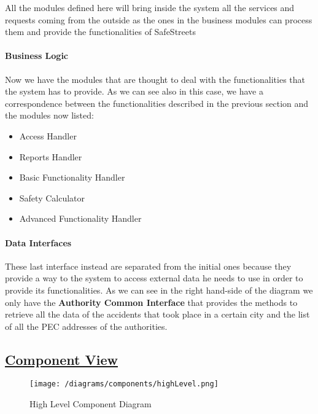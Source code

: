 			All the modules defined here will bring inside the system all the services and requests coming from the outside as the ones in the business modules can process them and provide the functionalities of SafeStreets
			
			\paragraph{Business Logic} Now we have the modules that are thought to deal with the functionalities that the system has to provide. As we can see also in this case, we have a correspondence between the functionalities described in the previous section and the modules now listed:
			
			\begin{itemize}
				\item Access Handler
				\item Reports Handler
				\item Basic Functionality Handler
				\item Safety Calculator
				\item Advanced Functionality Handler
			\end{itemize}
		
			\paragraph{Data Interfaces} These last interface instead are separated from the initial ones because they provide a way to the system to access external data he needs to use in order to provide its functionalities. As we can see in the right hand-side of the diagram we only have the \textbf{Authority Common Interface} that provides the methods to retrieve all the data of the accidents that took place in a certain city and the list of all the PEC addresses of the authorities.
		
	\subsection[Component View]{\hyperlink{toc}{Component View}}
		\label{sec:componentView}
		
		\begin{figure}[ht]
			\centering
			\texttt{[image: /diagrams/components/highLevel.png]}
			\caption{\label{fig:highLevelComp} High Level Component Diagram}
		\end{figure}
	
